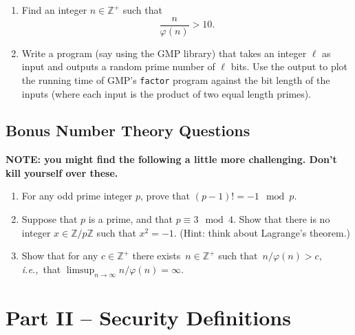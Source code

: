 \documentclass[12pt]{article}
\newcommand{\Z}{\mathbb{Z}}
\newcommand{\zp}{\ensuremath{\Z/p\Z}}
\newcommand{\te}{there exists\xspace}
\newcommand{\st}{such that\xspace}
\newcommand{\ie}{\emph{i.e.,}\xspace}
\begin{document}
\begin{enumerate}
\item Find an integer \(n\in\Z^+\) such that \[\frac{n}{\varphi(n)} >
    10.\]

\item  Write a program (say using the GMP library) that takes an integer
  \(\ell\) as input and outputs a random prime number of \(\ell\) bits.  Use
  the output to plot the running time of GMP's \texttt{factor} program against
  the bit length of the inputs (where each input is the product of two equal
  length primes).

\end{enumerate}

\subsection*{Bonus Number Theory Questions}
\noindent\textbf{NOTE: you might find the following a little more challenging.
Don't kill yourself over these.}
\begin{enumerate}

\item For any odd prime integer \(p\), prove that \((p-1)! = -1 \mod p\).

\item Suppose that \(p\) is a prime, and that \(p\equiv 3 \mod 4\).  Show
    that there is no integer \(x\in\zp\) such that \(x^2 = -1\).  (Hint:
    think about Lagrange's theorem.)

\item Show that for any \(c\in\Z^+\) \te\ \(n\in\Z^+\) \st\ \(n/\varphi(n) >
    c\), \ie\ that \(\limsup_{n\rightarrow \infty}n/\varphi(n) = \infty\).

\end{enumerate}


\section{Part II -- Security Definitions} %
\end{document}
